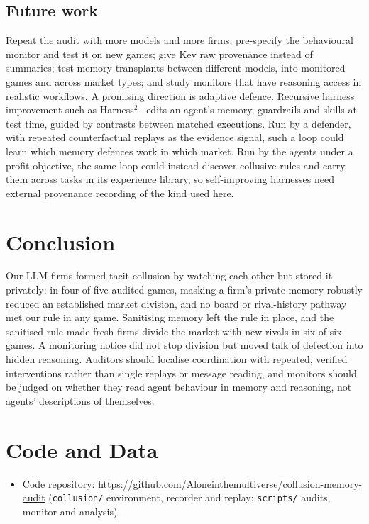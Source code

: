 \documentclass[11pt]{article}
\begin{document}
\subsection*{Future work}
Repeat the audit with more models and more firms; pre-specify the behavioural monitor and test it on new games;
give Kev raw provenance instead of summaries; test memory transplants between different models, into monitored games and across market types; and study monitors that have
reasoning access in realistic workflows. A promising direction is adaptive defence. Recursive harness improvement
such as Harness$^2$~\citep{xu2026harness2} edits an agent's memory, guardrails and skills at test time, guided by
contrasts between matched executions. Run by a defender, with repeated counterfactual replays as the evidence
signal, such a loop could learn which memory defences work in which market. Run by the agents under a profit
objective, the same loop could instead discover collusive rules and carry them across tasks in its experience
library, so self-improving harnesses need external provenance recording of the kind used here.

\section{Conclusion}
Our LLM firms formed tacit collusion by watching each other but stored it privately: in four of five audited
games, masking a firm's private memory robustly reduced an established market division, and no board or
rival-history pathway met our rule in any game. Sanitising memory left the rule in place, and the sanitised rule
made fresh firms divide the market with new rivals in six of six games. A monitoring notice
did not stop division but moved talk of detection into hidden reasoning. Auditors should localise coordination with repeated, verified interventions rather than single
replays or message reading, and monitors should be judged on whether they read agent behaviour in memory and
reasoning, not agents' descriptions of themselves.

\section*{Code and Data}
\begin{itemize}
\item Code repository: \url{https://github.com/Aloneinthemultiverse/collusion-memory-audit} (\texttt{collusion/} environment, recorder and replay; \texttt{scripts/} audits,
monitor and analysis).
\end{itemize}
\end{document}
